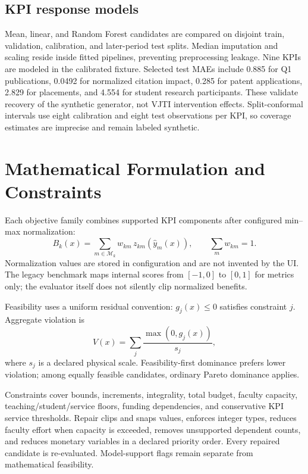 \documentclass[12pt,a4paper]{report}
\begin{document}
\section{KPI response models}
Mean, linear, and Random Forest candidates are compared on disjoint train, validation, calibration, and later-period test splits. Median imputation and scaling reside inside fitted pipelines, preventing preprocessing leakage. Nine KPIs are modeled in the calibrated fixture. Selected test MAEs include 0.885 for Q1 publications, 0.0492 for normalized citation impact, 0.285 for patent applications, 2.829 for placements, and 4.554 for student research participants. These validate recovery of the synthetic generator, not VJTI intervention effects. Split-conformal intervals use eight calibration and eight test observations per KPI, so coverage estimates are imprecise and remain labeled synthetic.

\chapter{Mathematical Formulation and Constraints}
Each objective family combines supported KPI components after configured min--max normalization:
\begin{equation}
B_k(x)=\sum_{m\in\mathcal{M}_k}w_{km}\,z_{km}(\widehat{y}_m(x)),\qquad \sum_m w_{km}=1.
\end{equation}
Normalization values are stored in configuration and are not invented by the UI. The legacy benchmark maps internal scores from $[-1,0]$ to $[0,1]$ for metrics only; the evaluator itself does not silently clip normalized benefits.

Feasibility uses a uniform residual convention: $g_j(x)\leq0$ satisfies constraint $j$. Aggregate violation is
\begin{equation}
V(x)=\sum_j\frac{\max(0,g_j(x))}{s_j},
\end{equation}
where $s_j$ is a declared physical scale. Feasibility-first dominance prefers lower violation; among equally feasible candidates, ordinary Pareto dominance applies.

Constraints cover bounds, increments, integrality, total budget, faculty capacity, teaching/student/service floors, funding dependencies, and conservative KPI service thresholds. Repair clips and snaps values, enforces integer types, reduces faculty effort when capacity is exceeded, removes unsupported dependent counts, and reduces monetary variables in a declared priority order. Every repaired candidate is re-evaluated. Model-support flags remain separate from mathematical feasibility.
\end{document}
